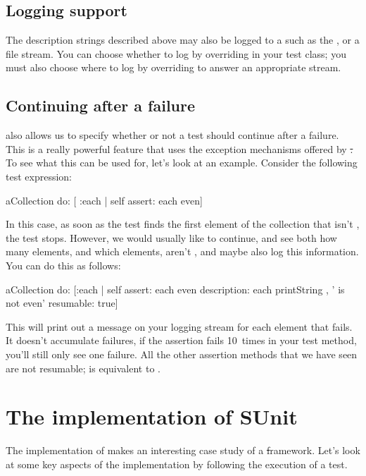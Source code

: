 \documentclass[a4paper,10pt,twoside]{book}
\begin{document}
{%
\subsection{Logging support}
The description strings described above may also be logged to a
 such as the , or a file stream.
You can choose whether to log by overriding
 in your test class; you must also choose where
to log by overriding  to answer an appropriate stream.

\subsection{Continuing after a failure}
\sunit also allows us to specify whether or not a test should continue after a failure.  This is a really
powerful feature that uses the exception mechanisms offered
by \st.  To see what this can be used for, let's look at an
example. Consider the following test expression:
\begin{code}{}
aCollection do: [ :each | self assert: each even]
\end{code}
In this case, as soon as the test finds the first element of the collection that isn't
, the test stops. 
However, we would usually like to
continue, and see both how many elements, and which elements, aren't
, and maybe also log this information.  You can do this
as follows:
\begin{code}{}
aCollection do:
	[:each |
	self
		assert: each even
		description: each printString , ' is not even'
		resumable: true]
\end{code}
This will print out a message on your logging stream for each element
that fails.  It doesn't accumulate failures, \ie if the assertion
fails 10~times in your test method, you'll still only see one failure.
All the other assertion methods that we have seen are not resumable;
 is equivalent to .
\section{The implementation of SUnit}

The implementation of \sunit makes an interesting case study of a \st framework.
Let's look at some key aspects of the implementation by following the
execution of a test.
}
\end{document}
